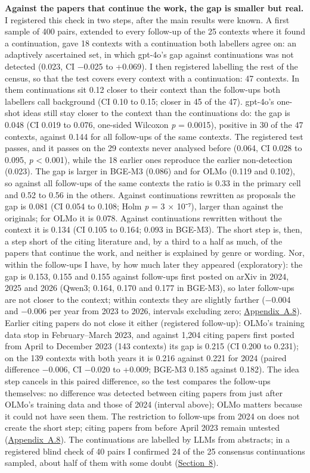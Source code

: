 \documentclass[
  10pt,
]{article}
\begin{document}
\textbf{Against the papers that continue
the work, the gap is smaller but real.}
I registered this check in two steps,
after the main results were known. A
first sample of 400 pairs, extended to
every follow-up of the 25 contexts where
it found a continuation, gave 18
contexts with a continuation both
labellers agree on: an adaptively
ascertained set, in which gpt-4o's gap
against continuations was not detected
(0.023, CI −0.025 to +0.069). I then
registered labelling the rest of the
census, so that the test covers every
context with a continuation: 47
contexts. In them continuations sit 0.12
closer to their context than the
follow-ups both labellers call
background (CI 0.10 to 0.15; closer in
45 of the 47). gpt-4o's one-shot ideas
still stay closer to the context than
the continuations do: the gap is 0.048
(CI 0.019 to 0.076, one-sided Wilcoxon
\emph{p} = 0.0015), positive in 30 of
the 47 contexts, against 0.144 for all
follow-ups of the same contexts. The
registered test passes, and it passes on
the 29 contexts never analysed before
(0.064, CI 0.028 to 0.095, \emph{p}
\textless{} 0.001), while the 18 earlier
ones reproduce the earlier non-detection
(0.023). The gap is larger in BGE-M3
(0.086) and for OLMo (0.119 and 0.102),
so against all follow-ups of the same
contexts the ratio is 0.33 in the
primary cell and 0.52 to 0.56 in the
others. Against continuations rewritten
as proposals the gap is 0.081 (CI 0.054
to 0.108; Holm \emph{p} = 3 × 10⁻⁷),
larger than against the originals; for
OLMo it is 0.078. Against continuations
rewritten without the context it is
0.134 (CI 0.105 to 0.164; 0.093 in
BGE-M3). The short step is, then, a step
short of the citing literature and, by a
third to a half as much, of the papers
that continue the work, and neither is
explained by genre or wording. Nor,
within the follow-ups I have, by how
much later they appeared (exploratory):
the gap is 0.153, 0.155 and 0.155
against follow-ups first posted on arXiv
in 2024, 2025 and 2026 (Qwen3; 0.164,
0.170 and 0.177 in BGE-M3), so later
follow-ups are not closer to the
context; within contexts they are
slightly farther (−0.004 and −0.006 per
year from 2023 to 2026, intervals
excluding zero;
\hyperref[app:A.8]{Appendix~A.8}).
Earlier citing papers do not close it
either (registered follow-up): OLMo's
training data stop in February--March
2023, and against 1,204 citing papers
first posted from April to December 2023
(143 contexts) its gap is 0.215 (CI
0.200 to 0.231); on the 139 contexts
with both years it is 0.216 against
0.221 for 2024 (paired difference
−0.006, CI −0.020 to +0.009; BGE-M3
0.185 against 0.182). The idea step
cancels in this paired difference, so
the test compares the follow-ups
themselves: no difference was detected
between citing papers from just after
OLMo's training data and those of 2024
(interval above); OLMo matters because
it could not have seen them. The
restriction to follow-ups from 2024 on
does not create the short step; citing
papers from before April 2023 remain
untested
(\hyperref[app:A.8]{Appendix~A.8}). The
continuations are labelled by LLMs from
abstracts; in a registered blind check
of 40 pairs I confirmed 24 of the 25
consensus continuations sampled, about
half of them with some doubt
(\hyperref[sec:8]{Section~8}).
\end{document}
